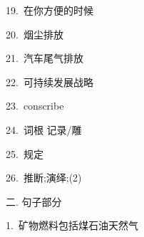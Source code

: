 \documentclass[a4paper, 12pt]{article}
\begin{document}
\begin{multicols}{2}
\begin{flushleft}
19.\ 在你方便的时候 \ \ \ \ \underline{\hspace{3cm}}
\end{flushleft}

\begin{flushleft}
20.\ 烟尘排放 \ \ \ \ \underline{\hspace{3cm}}
\end{flushleft}
\end{multicols}

\begin{multicols}{2}
\begin{flushleft}
21.\ 汽车尾气排放 \ \ \ \ \underline{\hspace{3cm}}
\end{flushleft}

\begin{flushleft}
22.\ 可持续发展战略 \ \ \ \ \underline{\hspace{3cm}}
\end{flushleft}
\end{multicols}

\begin{multicols}{2}
\begin{flushleft}
23.\ conscribe \ \ \ \ \underline{\hspace{3cm}}
\end{flushleft}

\begin{flushleft}
24.\ 词根 记录/雕 \ \ \ \ \underline{\hspace{3cm}}
\end{flushleft}
\end{multicols}

\begin{multicols}{2}
\begin{flushleft}
25.\ 规定 \ \ \ \ \underline{\hspace{3cm}}
\end{flushleft}

\begin{flushleft}
26.\ 推断;演绎;(2) \ \ \ \ \underline{\hspace{3cm}}
\end{flushleft}
\end{multicols}

\begin{flushleft}
二. 句子部分
\end{flushleft}

\begin{flushleft}
1.\ 矿物燃料包括煤石油天然气

\underline{\hspace{16cm}}
\end{flushleft}
\end{document}
